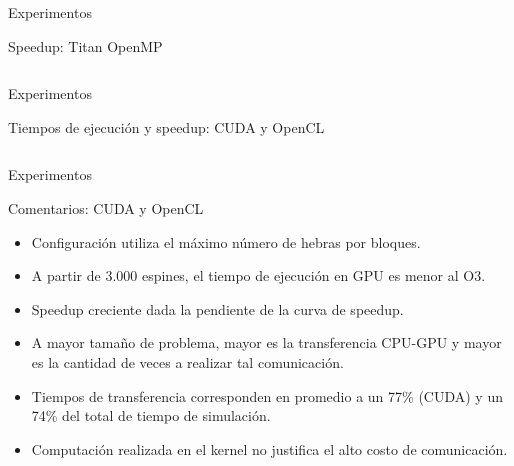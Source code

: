\begin{frame}{Experimentos}
\begin{block}{Speedup: Titan OpenMP}

\begin{columns}
  \begin{column}{.50\textwidth}
	\centerline{
      }

  \end{column}
  \begin{column}{.50\textwidth}
    \centerline{
      }
  \end{column}
  \end{columns}
\end{block}
\end{frame}
\begin{frame}{Experimentos}
\begin{block}{Tiempos de ejecución y speedup: CUDA y OpenCL}

\begin{columns}
  \begin{column}{.50\textwidth}
	\centerline{
      }

  \end{column}
  \begin{column}{.50\textwidth}
    \centerline{
      }
  \end{column}
  \end{columns}
\end{block}
\end{frame}

\begin{frame}{Experimentos}
\begin{block}{Comentarios: CUDA y OpenCL}
\begin{itemize}
	  \item Configuración utiliza el máximo número de hebras por bloques.
	  \item A partir de 3.000 espines, el tiempo de ejecución en GPU es menor al O3.
	  \item Speedup creciente dada la pendiente de la curva de speedup.
	  \item A mayor tamaño de problema, mayor es la transferencia CPU-GPU y mayor es la cantidad de veces a realizar tal comunicación.
	  \item Tiempos de transferencia corresponden en promedio a un 77\% (CUDA) y un 74\% del total de tiempo de simulación.
	  \item Computación realizada en el kernel no justifica el alto costo de comunicación.
	\end{itemize}
\end{block}
\end{frame}

